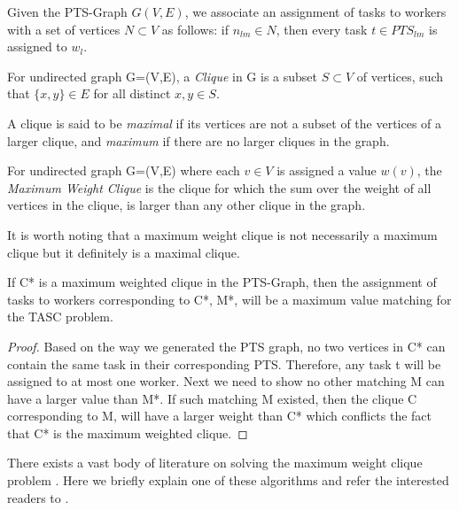 Given the PTS-Graph $G(V, E)$, we associate an assignment of tasks to workers with a set of vertices $N \subset V$ as follows: if $n_{lm} \in N$, then every task $t \in PTS_{lm}$ is assigned to $w_l$.

\begin{definition} [Clique]
\label{def:clique}
For undirected graph G=(V,E), a \emph{Clique} in G is a subset $S \subset V$ of vertices, such that $\{x,y\} \in E$ for all distinct $x,y \in S$.
\end{definition}

A clique is said to be \emph{maximal} if its vertices are not a subset of the vertices of a larger clique, and \emph{maximum} if there are no larger cliques in the graph.

\begin{definition} 
\label{def:maxClique}
For undirected graph G=(V,E) where each $v \in V$ is assigned a value $w(v)$, the \emph{Maximum Weight Clique} is the clique for which the sum over the weight of all vertices in the clique, is larger than any other clique in the graph.
\end{definition}

It is worth noting that a maximum weight clique is not necessarily a maximum clique but it definitely is a maximal clique.

\begin{theorem}
\label{th:maxClique}
If C* is a maximum weighted clique in the PTS-Graph, then the assignment of tasks to workers corresponding to C*, M*, will be a maximum value matching for the TASC problem.
\end{theorem}

\begin{proof}
Based on the way we generated the PTS graph, no two vertices in C* can contain the same task in their corresponding PTS. Therefore, any task t will be assigned to at most one worker. Next we need to show no other matching M can have a larger value than M*. If such matching M existed, then the clique C corresponding to M, will have a larger weight than C* which conflicts the fact that C* is the maximum weighted clique.
\end{proof}

There exists a vast body of literature on solving the maximum weight clique problem \cite{Kovalyov07}. Here we briefly explain one of these algorithms and refer the interested readers to \cite{Ostergard01}.\\

